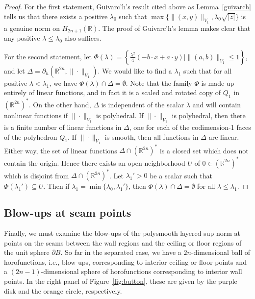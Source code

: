 \documentclass{article}
\theoremstyle{definition}
\newcommand{\norm}[1]{\|#1\|}
\newcommand{\bhor}{\partial_h}
\newcommand{\HHR}{H_{2n+1}(\mathbb{R})}
\newcommand{\R}{{\mathbb R}}
\begin{document}
\begin{proof}
For the first statement, Guivarc'h's result cited above as Lemma~\ref{guivarch} tells us that there exists a positive $\lambda_0$ such that $\max \{\norm{(x,y)}_{V_1}, \lambda_0 \sqrt{|z|}\}$ is a genuine norm on $\HHR$. The proof of Guivarc'h's lemma makes clear that any positive $\lambda\leq \lambda_0$ also suffices.

For the second statement, let $\Phi(\lambda) = \left\{\frac{\lambda^2}4(-b\cdot x + a\cdot y)\mid \norm{(a,b)}_{V_1} \leq 1\right\}$, and let $\Delta =\bhor(\R^{2n}, \norm{\cdot}_{V_1})$. We would like to find a $\lambda_1$ such that for all positive $\lambda < \lambda_1$, we have
$\Phi(\lambda) \cap \Delta = \emptyset$. Note that the family $\Phi$ is made up entirely of linear functions, and in fact it is a scaled and rotated copy of $Q_1$ in $(\R^{2n})^*$. On the other hand, $\Delta$ is independent of the scalar $\lambda$ and will contain nonlinear functions if $\norm{\cdot}_{V_1}$ is polyhedral. If $\norm{\cdot}_{V_1}$ is polyhedral, then there is a finite number of linear functions in $\Delta$, one for each of the codimension-1 faces of the polyhedron $Q_1$. If $\norm{\cdot}_{V_1}$ is smooth, then all functions in $\Delta$ are linear. Either way, the set of linear functions $\Delta \cap (\R^{2n})^*$ is a closed set which does not contain the origin. Hence there exists an open neighborhood $U$ of $0 \in (\R^{2n})^*$ which is disjoint from $\Delta \cap (\R^{2n})^*$. Let $\lambda_1'>0$ be a scalar such that $\Phi(\lambda_1') \subseteq U$. Then if $\lambda_1 = \min\{\lambda_0, \lambda_1'\}$, then $\Phi(\lambda) \cap \Delta = \emptyset$ for all $\lambda \leq \lambda_1$.
\end{proof}



\subsection{Blow-ups at seam points}\label{sec:seam}

Finally, we must examine the blow-ups of the polysmooth layered sup norm at points on the seams between the wall regions and the ceiling or floor regions of the unit sphere $\partial B$. So far in the separated case, we have a $2n$-dimensional ball of horofunctions, i.e., blow-ups, corresponding to interior ceiling or floor points and a $(2n-1)$-dimensional sphere of horofunctions corresponding to interior wall points. In the right panel of Figure~\ref{fig:button}, these are given by the purple disk and the orange circle, respectively.
\end{document}
